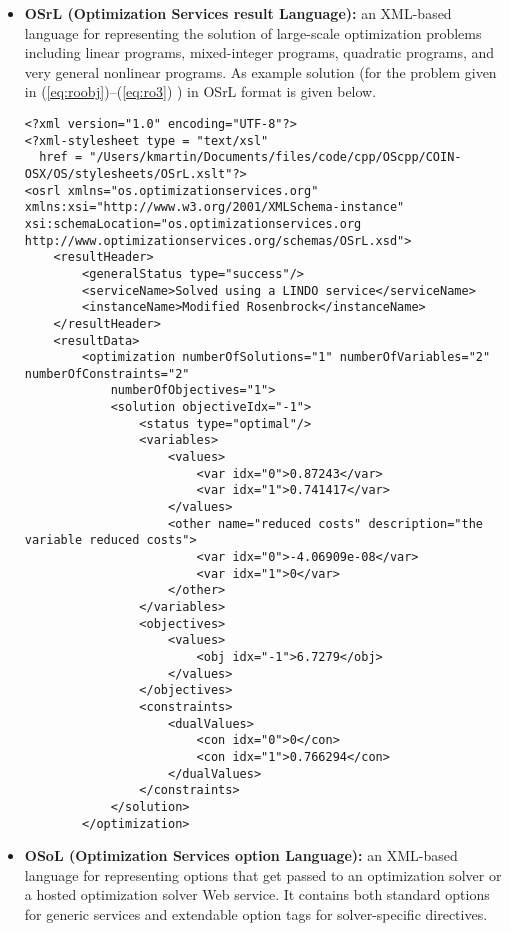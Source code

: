 \documentclass[11pt]{article}
\renewcommand{\_}{{\char"5F}}
\renewcommand{\{}{{\char"7B}}
\renewcommand{\}}{{\char"7D}}
\renewcommand{\^}{{\char"0D}}
\renewcommand{\'}{{\char"0D}}
\begin{document}
\begin{itemize}
\item[] {\bf OSrL (Optimization Services result Language):}  an
XML-based language for representing the solution of large-scale
optimization problems including linear programs, mixed-integer programs,
quadratic programs, and very general nonlinear programs.  As example solution (for the problem given in
 (\ref{eq:roobj})--(\ref{eq:ro3}) ) in OSrL format is given below.

\begin{verbatim}
<?xml version="1.0" encoding="UTF-8"?>
<?xml-stylesheet type = "text/xsl"
  href = "/Users/kmartin/Documents/files/code/cpp/OScpp/COIN-OSX/OS/stylesheets/OSrL.xslt"?>
<osrl xmlns="os.optimizationservices.org"
xmlns:xsi="http://www.w3.org/2001/XMLSchema-instance"
xsi:schemaLocation="os.optimizationservices.org
http://www.optimizationservices.org/schemas/OSrL.xsd">
    <resultHeader>
        <generalStatus type="success"/>
        <serviceName>Solved using a LINDO service</serviceName>
        <instanceName>Modified Rosenbrock</instanceName>
    </resultHeader>
    <resultData>
        <optimization numberOfSolutions="1" numberOfVariables="2" numberOfConstraints="2"
            numberOfObjectives="1">
            <solution objectiveIdx="-1">
                <status type="optimal"/>
                <variables>
                    <values>
                        <var idx="0">0.87243</var>
                        <var idx="1">0.741417</var>
                    </values>
                    <other name="reduced costs" description="the variable reduced costs">
                        <var idx="0">-4.06909e-08</var>
                        <var idx="1">0</var>
                    </other>
                </variables>
                <objectives>
                    <values>
                        <obj idx="-1">6.7279</obj>
                    </values>
                </objectives>
                <constraints>
                    <dualValues>
                        <con idx="0">0</con>
                        <con idx="1">0.766294</con>
                    </dualValues>
                </constraints>
            </solution>
        </optimization>

\end{verbatim}




\item[] {\bf OSoL (Optimization Services option Language):}  an
XML-based language for representing options that get passed to an optimization solver or a hosted optimization solver Web service. It contains both standard options for generic services and extendable option tags for solver-specific directives.


\end{itemize}
\end{document}
